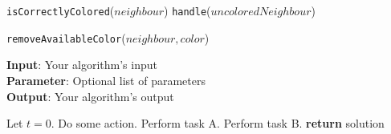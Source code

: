 \documentclass{article}
\begin{document}
	\begin{algorithm}[tb]
		\caption{\texttt{updateNeighbours}($vertex, color$)}
		\begin{algorithmic}[1]
			
			\RETURN \texttt{isCorrectlyColored}($neighbour$)
			\STATE \texttt{handle}($uncoloredNeighbour$)
			
			\STATE \texttt{removeAvailableColor}($neighbour, color$)
			\ENDIF
			\ENDFOR
		\end{algorithmic}
	\end{algorithm}
	

\begin{algorithm}[tb]
\caption{Example algorithm}
\label{alg:algorithm}
\textbf{Input}: Your algorithm's input\\
\textbf{Parameter}: Optional list of parameters\\
\textbf{Output}: Your algorithm's output
\begin{algorithmic}[1] %
\STATE Let $t=0$.
\STATE Do some action.
\STATE Perform task A.
\ELSE
\STATE Perform task B.
\ENDIF
\ENDWHILE
\STATE \textbf{return} solution
\end{algorithmic}
\end{algorithm}





%

%

\end{document}

